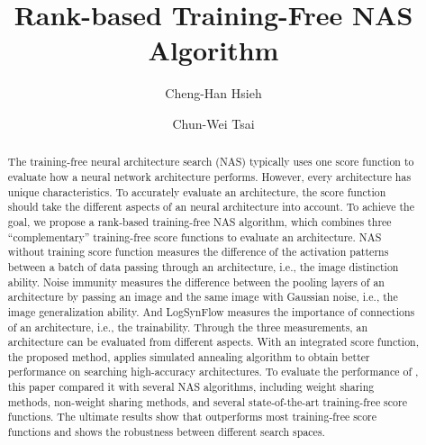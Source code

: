 \documentclass[sigconf]{acmart}
\begin{document}
\title{Rank-based Training-Free NAS Algorithm}

\author{Cheng-Han Hsieh}

\author{Chun-Wei Tsai}

\begin{abstract}
    The training-free neural architecture search (NAS) typically uses one  
    score function to evaluate how a neural network architecture performs. 
    However, every architecture has unique characteristics. To accurately 
    evaluate an architecture, the score function should take the different 
    aspects of an neural architecture into account. 
    To achieve the goal, we propose a rank-based training-free NAS algorithm, 
    which combines three ``complementary'' training-free score functions to 
	evaluate an architecture. 
	NAS without training score function measures the difference 
    of the activation patterns between a batch of data passing through an 
    architecture, i.e., the image distinction ability. 
	Noise immunity measures the difference between the pooling layers 
    of an architecture by passing an image and the same image with Gaussian noise, 
    i.e., the image generalization ability. 
	And LogSynFlow measures the importance of connections of an architecture, 
    i.e., the trainability. 
    Through the three measurements, an architecture can be evaluated from 
    different aspects. With an integrated score function, the proposed 
    method, \palg{} applies simulated annealing algorithm to obtain 
    better performance on searching high-accuracy architectures. 
    To evaluate the performance of \palg{}, this paper compared 
    it with several NAS algorithms, including weight sharing methods, 
    non-weight sharing methods, and several state-of-the-art training-free 
    score functions. The ultimate results show that \palg{} outperforms most 
    training-free score functions and shows the robustness between different 
    search spaces. 

\end{abstract}
\maketitle
\end{document}
